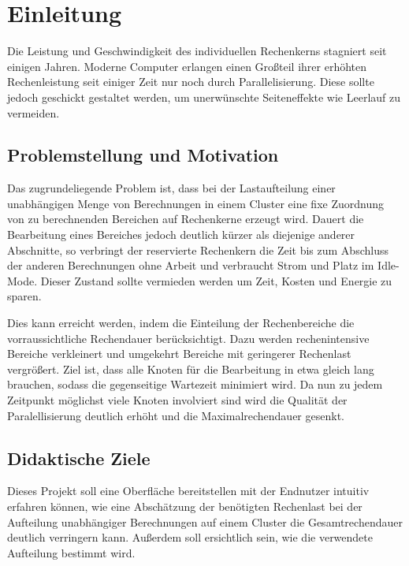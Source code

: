 \section{Einleitung}

Die Leistung und Geschwindigkeit des individuellen Rechenkerns stagniert seit einigen Jahren.
Moderne Computer erlangen einen Großteil ihrer erhöhten Rechenleistung
seit einiger Zeit nur noch durch Parallelisierung.
Diese sollte jedoch geschickt gestaltet werden, um unerwünschte Seiteneffekte
wie Leerlauf zu vermeiden.

\subsection{Problemstellung und Motivation}

Das zugrundeliegende Problem ist, dass bei der Lastaufteilung einer unabhängigen Menge
von Berechnungen in einem Cluster eine fixe Zuordnung von
zu berechnenden Bereichen auf Rechenkerne erzeugt wird. Dauert die Bearbeitung eines Bereiches jedoch deutlich kürzer
als diejenige anderer Abschnitte, so verbringt der reservierte Rechenkern die Zeit bis zum Abschluss der anderen Berechnungen
ohne Arbeit und verbraucht Strom und Platz im Idle-Mode.
Dieser Zustand sollte vermieden werden um Zeit, Kosten und Energie zu sparen.

Dies kann erreicht werden, indem die Einteilung der Rechenbereiche die vorraussichtliche Rechendauer berücksichtigt.
Dazu werden rechenintensive Bereiche verkleinert und umgekehrt Bereiche mit geringerer Rechenlast vergrößert.
Ziel ist, dass alle Knoten für die Bearbeitung in etwa gleich lang brauchen,
sodass die gegenseitige Wartezeit minimiert wird.
Da nun zu jedem Zeitpunkt möglichst viele Knoten involviert sind wird die Qualität der Paralellisierung deutlich erhöht
und die Maximalrechendauer gesenkt.

\subsection{Didaktische Ziele}

Dieses Projekt soll eine Oberfläche bereitstellen mit der Endnutzer intuitiv erfahren können, wie
eine Abschätzung der benötigten Rechenlast bei der Aufteilung unabhängiger
Berechnungen auf einem Cluster die Gesamtrechendauer deutlich verringern kann.
Außerdem soll ersichtlich sein, wie die verwendete Aufteilung bestimmt wird.

